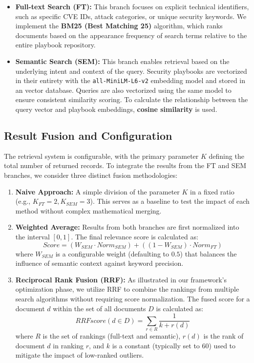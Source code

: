 \documentclass[conference]{IEEEtran}
\begin{document}
\begin{itemize}
    \item \textbf{Full-text Search (FT):} This branch focuses on explicit technical identifiers, such as specific CVE IDs, attack categories, or unique security keywords. We implement the \textbf{BM25 (Best Matching 25)} algorithm, which ranks documents based on the appearance frequency of search terms relative to the entire playbook repository.
    \item \textbf{Semantic Search (SEM):} This branch enables retrieval based on the underlying intent and context of the query. Security playbooks are vectorized in their entirety with the \texttt{all-MiniLM-L6-v2} embedding model and stored in an vector database. Queries are also vectorized using the same model to ensure consistent similarity scoring. To calculate the relationship between the query vector and playbook embeddings, \textbf{cosine similarity} is used.
\end{itemize}

\subsection{Result Fusion and Configuration}
The retrieval system is configurable, with the primary parameter $K$ defining the total number of returned records. To integrate the results from the FT and SEM branches, we consider three distinct fusion methodologies:

\begin{enumerate}
    \item \textbf{Naive Approach:} A simple division of the parameter $K$ in a fixed ratio (e.g., $K_{FT} = 2, K_{SEM} = 3$). This serves as a baseline to test the impact of each method without complex mathematical merging.
    \item \textbf{Weighted Average:} Results from both branches are first normalized into the interval $[0, 1]$. The final relevance score is calculated as:
    \begin{equation}
        Score = (W_{SEM} \cdot Norm_{SEM}) + ((1 - W_{SEM}) \cdot Norm_{FT})
    \end{equation}
    where $W_{SEM}$ is a configurable weight (defaulting to $0.5$) that balances the influence of semantic context against keyword precision.
    \item \textbf{Reciprocal Rank Fusion (RRF):} As illustrated in our framework's optimization phase, we utilize RRF to combine the rankings from multiple search algorithms without requiring score normalization. The fused score for a document $d$ within the set of all documents $D$ is calculated as:
    \begin{equation}
        RRFscore(d \in D) = \sum_{r \in R} \frac{1}{k + r(d)}
    \end{equation}
    where $R$ is the set of rankings (full-text and semantic), $r(d)$ is the rank of document $d$ in ranking $r$, and $k$ is a constant (typically set to 60) used to mitigate the impact of low-ranked outliers.
\end{enumerate}
\end{document}
